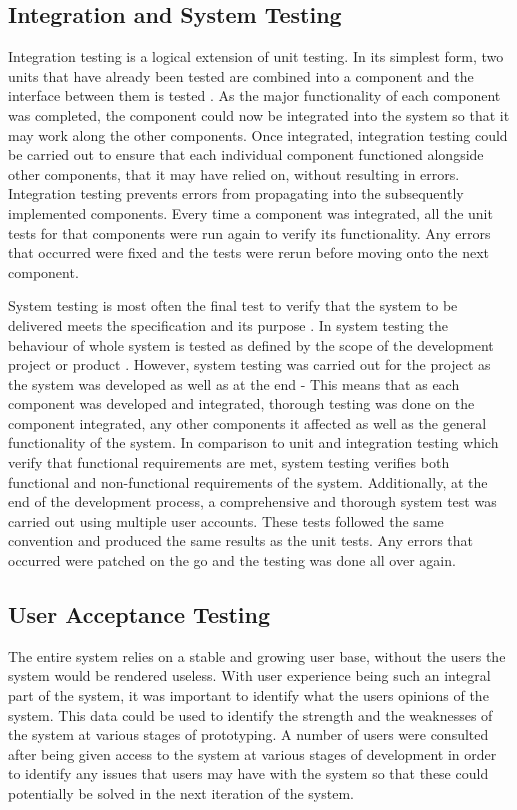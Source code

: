 \subsection{Integration and System Testing}
Integration testing is a logical extension of unit testing. In its simplest form, two units that have already been tested are combined into a component and the interface between them is tested \cite{MSDN:IntegrationTesting}. As the major functionality of each component was completed, the component could now be integrated into the system so that it may work along the other components. Once integrated, integration testing could be carried out to ensure that each  individual component functioned alongside other components, that it may have relied on, without resulting in errors. Integration testing prevents errors from propagating into the subsequently implemented components. Every time a component was integrated, all the unit tests for that components were run again to verify its functionality. Any errors that occurred were fixed and the tests were rerun before moving onto the next component. 

System testing is most often the final test to verify that the system to be delivered meets the specification and its purpose \cite{ISTQB:SystemTesting}. In system testing the behaviour of whole system is tested as defined by the scope of the development project or product \cite{ISTQB:SystemTesting}. However, system testing was carried out for the project as the system was developed as well as at the end - This means that as each component was developed and integrated, thorough testing was done on the component integrated, any other components it affected as well as the general functionality of the system. In comparison to unit and integration testing which verify that functional requirements are met, system testing verifies both functional and non-functional requirements of the system. Additionally, at the end of the development process, a comprehensive and thorough system test was carried out using multiple user accounts. These tests followed the same convention and produced the same results as the unit tests. Any errors that occurred were patched on the go and the testing was done all over again.

\subsection{User Acceptance Testing}
The entire system relies on a stable and growing user base, without the users the system would be rendered useless. With user experience being such an integral part of the system, it was important to identify what the users opinions of the system. This data could be used to identify the strength and the weaknesses of the system at various stages of prototyping. A number of users were consulted after being given access to the system at various stages of development in order to identify any issues that users may have with the system so that these could potentially be solved in the next iteration of the system.

